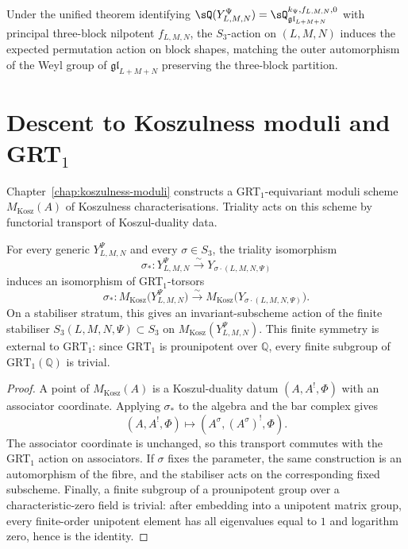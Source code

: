 \begin{corollary}
\label{cor:triality-unified-Q}
Under the unified theorem identifying
$\sQ(Y_{L,M,N}^\Psi) = \sQ_{\mathfrak{gl}_{L+M+N}}^{k_\Psi, f_{L,M,N}, 0}$
with principal three-block nilpotent $f_{L,M,N}$, the $S_3$-action
on $(L,M,N)$ induces the expected permutation action on block
shapes, matching the outer automorphism of the Weyl group of
$\mathfrak{gl}_{L+M+N}$ preserving the three-block partition.
\end{corollary}

\section{Descent to Koszulness moduli and GRT$_1$}
\label{sec:triality-koszulness-moduli}

Chapter~\ref{chap:koszulness-moduli} constructs a
GRT$_1$-equivariant moduli scheme
$M_{\mathrm{Kosz}}(A)$ of Koszulness characterisations. Triality
acts on this scheme by functorial transport of Koszul-duality data.

\begin{corollary}
\label{cor:triality-normalizes-mkosz}
For every generic $Y_{L,M,N}^{\Psi}$ and every $\sigma\in S_3$, the
triality isomorphism
\[
\sigma_*:Y_{L,M,N}^{\Psi}\xrightarrow{\sim}
Y_{\sigma\cdot(L,M,N,\Psi)}
\]
induces an isomorphism of GRT$_1$-torsors
\[
\sigma_*:
M_{\mathrm{Kosz}}\!\bigl(Y_{L,M,N}^{\Psi}\bigr)
\xrightarrow{\sim}
M_{\mathrm{Kosz}}\!\bigl(Y_{\sigma\cdot(L,M,N,\Psi)}\bigr).
\]
On a stabiliser stratum, this gives an invariant-subscheme action of the
finite stabiliser $S_3(L,M,N,\Psi)\subset S_3$ on
$M_{\mathrm{Kosz}}(Y_{L,M,N}^{\Psi})$. This finite symmetry is external
to $\mathrm{GRT}_1$: since $\mathrm{GRT}_1$ is prounipotent over
$\mathbb Q$, every finite subgroup of $\mathrm{GRT}_1(\mathbb Q)$ is
trivial.
\end{corollary}

\begin{proof}
A point of $M_{\mathrm{Kosz}}(A)$ is a Koszul-duality datum
$(A,A^!,\Phi)$ with an associator coordinate. Applying $\sigma_*$ to
the algebra and the bar complex gives
\[
(A,A^!,\Phi)\longmapsto
(A^\sigma,(A^\sigma)^!,\Phi).
\]
The associator coordinate is unchanged, so this transport commutes with
the GRT$_1$ action on associators. If $\sigma$ fixes the parameter, the
same construction is an automorphism of the fibre, and the stabiliser
acts on the corresponding fixed subscheme. Finally, a finite subgroup
of a prounipotent group over a characteristic-zero field is trivial:
after embedding into a unipotent matrix group, every finite-order
unipotent element has all eigenvalues equal to $1$ and logarithm zero,
hence is the identity.
\end{proof}

